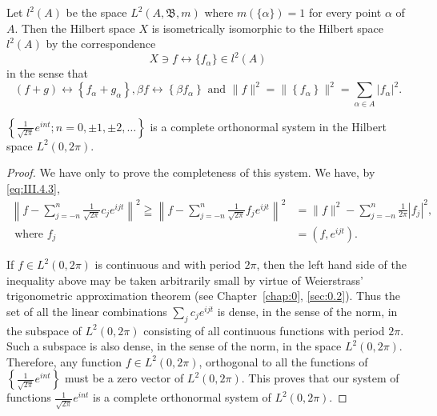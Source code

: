 \begin{corollary}\label{cor:III.4.Corollary.2} Let $l^2(A)$ be the space $L^2(A, \mathfrak{B}, m)$ where $m(\{\alpha\}) = 1$ for every point $\alpha$ of $A$. Then the Hilbert space $X$ is isometrically isomorphic to the Hilbert space $l^2(A)$ by the correspondence 
\begin{equation}\label{eq:III.4.6}
X \ni f \leftrightarrow \{f _{\alpha} \} \in l ^{2} (A)
\end{equation}
in the sense that 
\begin{equation}\label{eq:III.4.7}
(f + g) \leftrightarrow \left\{f _{\alpha} + g _{\alpha} \right\}, \beta f \leftrightarrow \left\{\beta f _{\alpha} \right\} \text{ and } \| f \| ^{2} = \| \left\{f _{\alpha} \right\} \| ^{2} = \sum\limits_{\alpha \in A} | f _{\alpha} | ^{2}.
\end{equation}
\end{corollary}

\begin{examplen} $\left\{\frac{1}{\sqrt{2\pi}} e^{int}; n = 0, \pm 1, \pm 2, \ldots\right\}$ is a complete orthonormal system in the Hilbert space $L^2(0, 2\pi)$.

\end{examplen}
\begin{proof}
 We have only to prove the completeness of this system. We have, by \eqref{eq:III.4.3}, 
\[
\begin{aligned}
\left\| f - \sum\limits_{j=-n} ^{n} \frac {1}{\sqrt {2 \pi}} c _{j} e ^{ijt} \right\| ^{2} \geqq \left\| f - \sum\limits_{j=-n} ^{n} \frac {1}{\sqrt {2 \pi}} f _{j} e ^{ijt} \right\| ^{2} &= \| f \| ^{2} - \sum\limits_{j=-n} ^{n} \frac {1}{2 \pi} | f _{j} | ^{2},
\\
\text{ where } f _{j} &= (f, e ^{ijt}). \end{aligned}
\]

If $f \in L^2(0, 2\pi)$ is continuous and with period $2\pi$, then the left hand side of the inequality above may be taken arbitrarily small by virtue of Weierstrass' trigonometric approximation theorem (see Chapter~\ref{chap:0}, \ref{sec:0.2}). Thus the set of all the linear combinations $\sum\limits_j c_j e^{ijt}$ is dense, in the sense of the norm, in the subspace of $L^2(0, 2\pi)$ consisting of all continuous functions with period $2\pi$. Such a subspace is also dense, in the sense of the norm, in the space $L^2(0, 2\pi)$. Therefore, any function $f \in L^2(0, 2\pi)$, orthogonal to all the functions of $\left\{\frac{1}{\sqrt{2\pi}} e^{int}\right\}$ must be a zero vector of $L^2(0, 2\pi)$. This proves that our system of functions $\frac{1}{\sqrt{2\pi}} e^{int}$ is a complete orthonormal system of $L^2(0, 2\pi)$. 
\end{proof}


